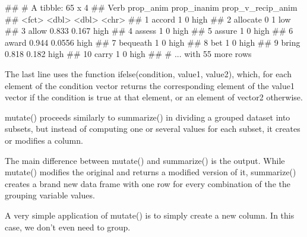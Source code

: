 \documentclass[
]{book}
\newenvironment{Shaded}{\begin{snugshade}}{\end{snugshade}}
\newcommand{\AttributeTok}[1]{\textcolor[rgb]{0.77,0.63,0.00}{#1}}
\newcommand{\CommentTok}[1]{\textcolor[rgb]{0.56,0.35,0.01}{\textit{#1}}}
\newcommand{\DecValTok}[1]{\textcolor[rgb]{0.00,0.00,0.81}{#1}}
\newcommand{\FunctionTok}[1]{\textcolor[rgb]{0.00,0.00,0.00}{#1}}
\newcommand{\NormalTok}[1]{#1}
\newcommand{\OtherTok}[1]{\textcolor[rgb]{0.56,0.35,0.01}{#1}}
\newcommand{\SpecialCharTok}[1]{\textcolor[rgb]{0.00,0.00,0.00}{#1}}
\newcommand{\StringTok}[1]{\textcolor[rgb]{0.31,0.60,0.02}{#1}}
\begin{document}
\begin{Shaded}
\begin{Highlighting}[]
\NormalTok{\#\# \# A tibble: 65 x 4}
\NormalTok{\#\#    Verb     prop\_anim prop\_inanim prop\_v\_recip\_anim}
\NormalTok{\#\#    \textless{}fct\textgreater{}        \textless{}dbl\textgreater{}       \textless{}dbl\textgreater{} \textless{}chr\textgreater{}            }
\NormalTok{\#\#  1 accord       1          0      high             }
\NormalTok{\#\#  2 allocate     0          1      low              }
\NormalTok{\#\#  3 allow        0.833      0.167  high             }
\NormalTok{\#\#  4 assess       1          0      high             }
\NormalTok{\#\#  5 assure       1          0      high             }
\NormalTok{\#\#  6 award        0.944      0.0556 high             }
\NormalTok{\#\#  7 bequeath     1          0      high             }
\NormalTok{\#\#  8 bet          1          0      high             }
\NormalTok{\#\#  9 bring        0.818      0.182  high             }
\NormalTok{\#\# 10 carry        1          0      high             }
\NormalTok{\#\# \# ... with 55 more rows}
\end{Highlighting}
\end{Shaded}

The last line uses the function ifelse(condition, value1, value2), which, for each element of the condition vector returns the corresponding element of the value1 vector if the condition is true at that element, or an element of vector2 otherwise.

mutate() proceeds similarly to summarize() in dividing a grouped dataset into subsets, but instead of computing one or several values for each subset, it creates or modifies a column.

The main difference between mutate() and summarize() is the output. While mutate() modifies the original and returns a modified version of it, summarize() creates a brand new data frame with one row for every combination of the the grouping variable values.

A very simple application of mutate() is to simply create a new column. In this case, we don't even need to group.

\begin{Shaded}
\end{Shaded}
\end{document}
